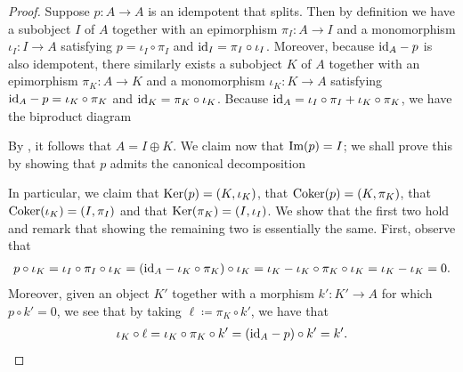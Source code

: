 \noindent\begin{proof} Suppose $p : A \to A$ is an idempotent that splits. Then by definition we have a subobject $I$ of $A$ together with an epimorphism $\pi_I : A \to I$ and a monomorphism $\iota_I : I \to A$ satisfying $p = \iota_I \circ \pi_I$ and $\textup{id}_{I} = \pi_I \circ \iota_I$. Moreover, because $\textup{id}_A - p$ is also idempotent, there similarly exists a subobject $K$ of $A$ together with an epimorphism $\pi_K : A \to K$ and a monomorphism $\iota_K : K \to A$ satisfying $\textup{id}_A - p = \iota_K \circ \pi_K$ and $\textup{id}_{K} = \pi_K \circ \iota_K$. Because $\textup{id}_A = \iota_I \circ \pi_I + \iota_K \circ \pi_K$, we have the biproduct diagram
\begin{center}
\end{center}
\noindent By \cite[Theorem VIII.2.2]{Mac13}, it follows that $A = I \oplus K$. We claim now that $\textup{Im}(p) = I$; we shall prove this by showing that $p$ admits the canonical decomposition
\begin{center}
\end{center}
\noindent In particular, we claim that $\textup{Ker}(p) = (K, \iota_K)$, that $\textup{Coker}(p) = (K, \pi_K)$, that $\textup{Coker}(\iota_K) = (I, \pi_I)$ and that $\textup{Ker}(\pi_K) = (I, \iota_I)$. We show that the first two hold and remark that showing the remaining two is essentially the same. First, observe that
\begin{align*}
\begin{split}
p \circ \iota_K = \iota_I \circ \pi_I \circ \iota_K = (\textup{id}_A - \iota_K \circ \pi_K) \circ \iota_K = \iota_K - \iota_K \circ \pi_K \circ \iota_K = \iota_K - \iota_K = 0.
\end{split}
\end{align*}
\noindent Moreover, given an object $K'$ together with a morphism $k' : K' \to A$ for which $p \circ k' = 0$, we see that by taking $\ell \coloneqq \pi_K \circ k'$, we have that
\begin{align*}
\begin{split}
\iota_K \circ \ell = \iota_K \circ \pi_K \circ k' = (\textup{id}_A - p) \circ k' = k'.

\end{split}
\end{align*}
\end{proof}
